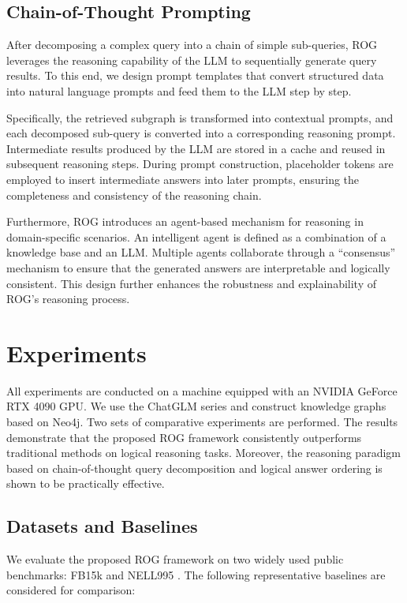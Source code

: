 \documentclass[11pt]{article}
\begin{document}
\subsection{Chain-of-Thought Prompting}
After decomposing a complex query into a chain of simple sub-queries, ROG leverages the reasoning capability of the LLM to sequentially generate query results.
To this end, we design prompt templates that convert structured data into natural language prompts and feed them to the LLM step by step.

Specifically, the retrieved subgraph is transformed into contextual prompts, and each decomposed sub-query is converted into a corresponding reasoning prompt.
Intermediate results produced by the LLM are stored in a cache and reused in subsequent reasoning steps.
During prompt construction, placeholder tokens are employed to insert intermediate answers into later prompts, ensuring the completeness and consistency of the reasoning chain.

Furthermore, ROG introduces an agent-based mechanism for reasoning in domain-specific scenarios.
An intelligent agent is defined as a combination of a knowledge base and an LLM.
Multiple agents collaborate through a ``consensus'' mechanism to ensure that the generated answers are interpretable and logically consistent.
This design further enhances the robustness and explainability of ROG's reasoning process.





\section{Experiments}

All experiments are conducted on a machine equipped with an NVIDIA GeForce RTX 4090 GPU.
We use the ChatGLM series \citep{glm2024chatglm} and construct knowledge graphs based on Neo4j.
Two sets of comparative experiments are performed.
The results demonstrate that the proposed ROG framework consistently outperforms traditional methods on logical reasoning tasks.
Moreover, the reasoning paradigm based on chain-of-thought query decomposition and logical answer ordering is shown to be practically effective.

\subsection{Datasets and Baselines}

We evaluate the proposed ROG framework on two widely used public benchmarks: FB15k \citep{bordes2013translating} and NELL995 \citep{xiong2017deeppath}.
The following representative baselines are considered for comparison:
\end{document}
